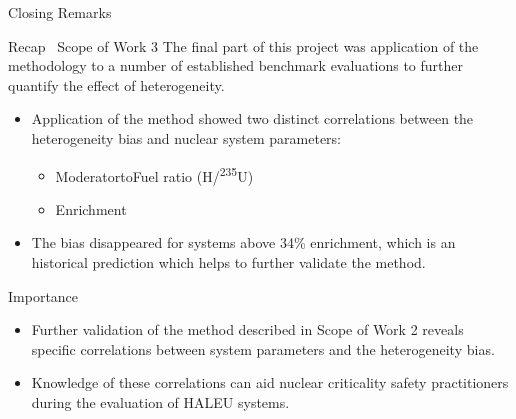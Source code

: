\documentclass[10pt,aspectratio=169]{beamer}              %
\begin{document}
\begin{frame}{Closing Remarks}
    \begin{block}{Recap \textendash\ Scope of Work 3}
        The final part of this project was application of the methodology to a number of established benchmark evaluations to further quantify the effect of heterogeneity.
    \end{block}
    \begin{itemize}
        \item Application of the method showed two distinct correlations between the heterogeneity bias and nuclear system parameters:
        \begin{itemize}
            \item Moderator\textendash to\textendash Fuel ratio (H/\textsuperscript{235}U)
            \item Enrichment
        \end{itemize}
        \item The bias disappeared for systems above 34\% enrichment, which is an historical prediction which helps to further validate the method.
    \end{itemize}
    \begin{alertblock}{Importance}
        \begin{itemize}
            \item Further validation of the method described in Scope of Work 2 reveals specific correlations between system parameters and the heterogeneity bias.
            \item Knowledge of these correlations can aid nuclear criticality safety practitioners during the evaluation of HALEU systems.
        \end{itemize}
    \end{alertblock}
\end{frame}
\end{document}
